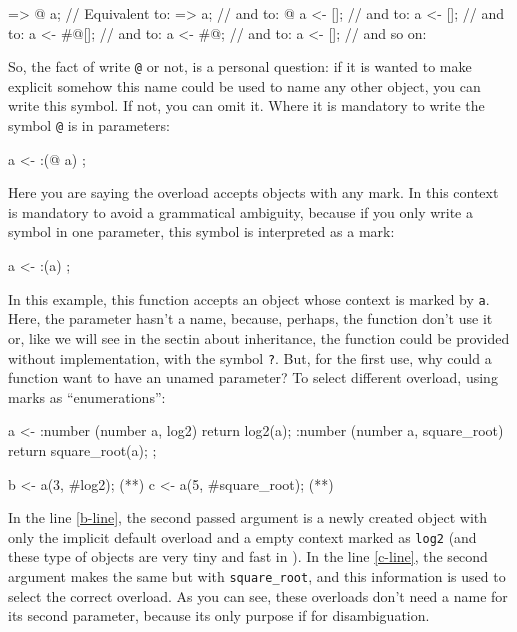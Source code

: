 \documentclass{article}
\begin{document}
\begin{faupp2}
  => @ a; // Equivalent to:
  => a;   // and to:
  @ a <- []; // and to:
  a <- [];  // and to:
  a <- #@[]; // and to:
  a <- #@;   // and to:
  a <- [];   // and so on:
\end{faupp2}

So, the fact of write \texttt{@} or not, is a personal question: if it is wanted
to make explicit somehow this name could be used to name any other object, you
can write this symbol. If not, you can omit it. Where it is mandatory to write
the symbol \texttt{@} is in parameters:

\begin{faupp2}
  a <- :(@ a) {};
\end{faupp2}

Here you are saying the overload accepts objects with any mark. In this context
is mandatory to avoid a grammatical ambiguity, because if you only write a
symbol in one parameter, this symbol is interpreted as a mark:

\begin{faupp2}
  a <- :(a) {};
\end{faupp2}

In this example, this function accepts an object whose context is marked by
\texttt{a}. Here, the parameter hasn't a name, because, perhaps, the function
don't use it or, like we will see in the sectin about inheritance, the function
could be provided without implementation, with the symbol \texttt{?}. But, for
the first use, why could a function want to have an unamed parameter? To select
different overload, using marks as ``enumerations'':

\begin{faupp2}
  a <- :number (number a, log2)
       {
         return log2(a);
       }
       :number (number a, square_root)
       {
         return square_root(a);
       }
       ;

  b <- a(3, #log2); (*\label{b-line}*)
  c <- a(5, #square_root); (*\label{c-line}*)
\end{faupp2}

In the line \ref{b-line}, the second passed argument is a newly created object
with only the implicit default overload and a empty context marked as
\texttt{log2} (and these type of objects are very tiny and fast in \faupp). In
the line \ref{c-line}, the second argument makes the same but with
\texttt{square\_root}, and this information is used to select the correct
overload. As you can see, these overloads don't need a name for its second
parameter, because its only purpose if for disambiguation.
\end{document}
